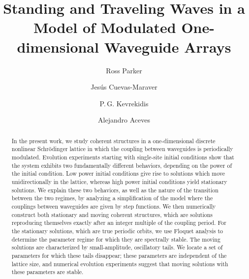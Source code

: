 \documentclass[reprint, amsmath,amssymb,aps,pre]{revtex4-2}
\begin{document}
\title{Standing and Traveling Waves in a Model of Modulated One-dimensional Waveguide Arrays}

\author{Ross Parker}

\author{Jes\'us Cuevas-Maraver}

\author{P.\,G. Kevrekidis} 

\author{Alejandro Aceves}

\begin{abstract}
In the present work, we study coherent structures in a one-dimensional discrete nonlinear 
Schr{\"o}dinger lattice  in which the coupling between waveguides is periodically modulated. Evolution experiments starting with single-site initial conditions show that the system exhibits two fundamentally different behaviors, depending on the power of the initial condition. Low power initial conditions give rise to solutions which move unidirectionally in the lattice, whereas high power initial conditions yield stationary solutions. We explain these two behaviors, as well as the nature
of the transition between the two regimes, by analyzing a simplification of the model where the couplings between waveguides are given by step functions. We then numerically construct both stationary and moving coherent structures, which are solutions reproducing themselves exactly after an integer multiple of the coupling period. For the stationary solutions, which are true periodic orbits, we use Floquet analysis to determine the parameter regime for which they are spectrally stable. The moving solutions are characterized by small-amplitude, oscillatory tails. We locate a set of parameters for which these tails disappear; these parameters are independent of the lattice size, and numerical evolution experiments suggest that moving solutions with these parameters are stable.
\end{abstract}
\end{document}
